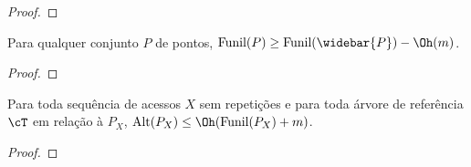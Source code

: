 \begin{proof}
\end{proof}

\begin{lemma} %
    Para qualquer conjunto $P$ de pontos, $\text{Funil}(P) \geq \text{Funil}(\widebar{P}) - \Oh(m)$.
\end{lemma}

\begin{proof}
\end{proof}

\begin{theorem}
    Para toda sequência de acessos $X$ sem repetições e para toda árvore de referência $\cT$ em relação à $P_X$, $\text{Alt}(P_X) \leq \Oh(\text{Funil}(P_X) + m)$.
\end{theorem}

\begin{proof}
\end{proof}